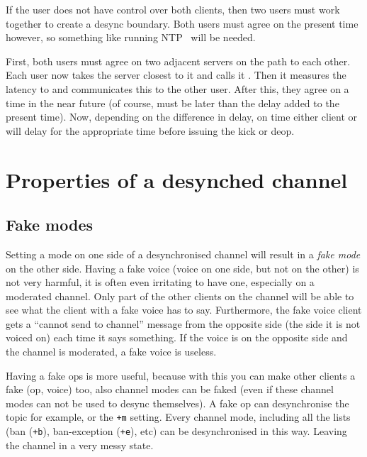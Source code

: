 \documentclass{article}
\theoremstyle{definition}
\begin{document}
\noindent
If the user does not have control over both clients, then two users must work
together to create a desync boundary. Both users must agree on the present time
however, so something like running NTP~\cite{NTP} will be needed.

First, both users must agree on two adjacent servers on the path to each other.
Each user now takes the server closest to it and calls it . Then it measures
the latency to  and communicates this to the other user. After this, they
agree on a time in the near future  (of course,  must be later than the
delay added to the present time). Now, depending on the difference in delay, on
time  either client  or  will delay for the appropriate time before
issuing the kick or deop.

\section{Properties of a desynched channel} \label{sec:properties}
\subsection{Fake modes} \label{sec:fm}
Setting a mode on one side of a desynchronised channel will result in a
\emph{fake mode} on the other side. Having a fake voice (voice on one side, but
not on the other) is not very harmful, it is often even irritating to have one,
especially on a moderated channel. Only part of the other clients on the
channel will be able to see what the client with a fake voice has to say.
Furthermore, the fake voice client gets a ``cannot send to channel'' message
from the opposite side (the side it is not voiced on) each time it says
something. If the voice is on the opposite side and the channel is moderated, a
fake voice is useless.

Having a fake ops is more useful, because with this you can make other clients
a fake (op, voice) too, also channel modes can be faked (even if these channel
modes can not be used to desync themselves). A fake op can desynchronise the
topic for example, or the \verb#+m# setting. Every channel mode, including all
the lists (ban (\verb#+b#), ban-exception (\verb#+e#), etc) can be
desynchronised in this way. Leaving the channel in a very messy state.
\end{document}
